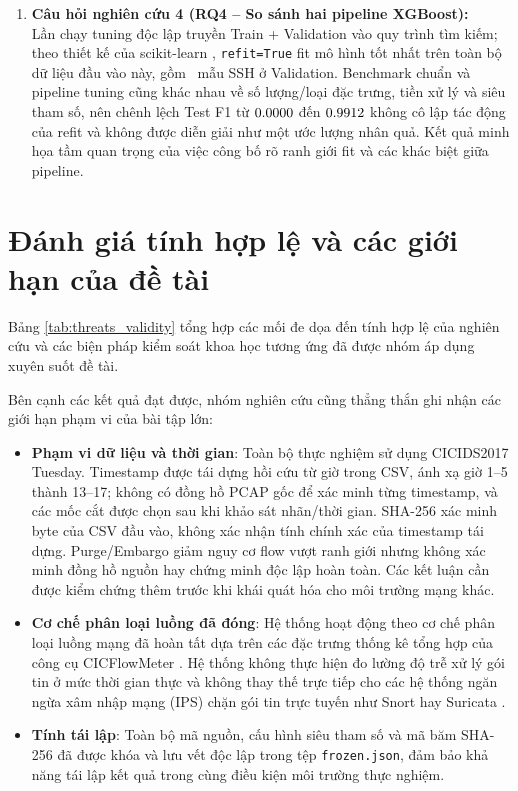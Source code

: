\begin{enumerate}
    \item \textbf{Câu hỏi nghiên cứu 4 (RQ4 -- So sánh hai pipeline XGBoost):}\\
    Lần chạy tuning độc lập truyền Train + Validation vào quy trình tìm kiếm; theo thiết kế của scikit-learn \cite{scikit_learn_refit}, \texttt{refit=True} fit mô hình tốt nhất trên toàn bộ dữ liệu đầu vào này, gồm \DataValidationSSH\ mẫu SSH ở Validation. Benchmark chuẩn và pipeline tuning cũng khác nhau về số lượng/loại đặc trưng, tiền xử lý và siêu tham số, nên chênh lệch Test F1 từ $0.0000$ đến $0.9912$ không cô lập tác động của refit và không được diễn giải như một ước lượng nhân quả. Kết quả minh họa tầm quan trọng của việc công bố rõ ranh giới fit và các khác biệt giữa pipeline.
\end{enumerate}

\section{Đánh giá tính hợp lệ và các giới hạn của đề tài}
\label{sec:threats_validity}

Bảng \ref{tab:threats_validity} tổng hợp các mối đe dọa đến tính hợp lệ của nghiên cứu và các biện pháp kiểm soát khoa học tương ứng đã được nhóm áp dụng xuyên suốt đề tài.



Bên cạnh các kết quả đạt được, nhóm nghiên cứu cũng thẳng thắn ghi nhận các giới hạn phạm vi của bài tập lớn:
\begin{itemize}
    \item \textbf{Phạm vi dữ liệu và thời gian}: Toàn bộ thực nghiệm sử dụng CICIDS2017 Tuesday. Timestamp được tái dựng hồi cứu từ giờ trong CSV, ánh xạ giờ 1--5 thành 13--17; không có đồng hồ PCAP gốc để xác minh từng timestamp, và các mốc cắt được chọn sau khi khảo sát nhãn/thời gian. SHA-256 xác minh byte của CSV đầu vào, không xác nhận tính chính xác của timestamp tái dựng. Purge/Embargo giảm nguy cơ flow vượt ranh giới nhưng không xác minh đồng hồ nguồn hay chứng minh độc lập hoàn toàn. Các kết luận cần được kiểm chứng thêm trước khi khái quát hóa cho môi trường mạng khác.
    \item \textbf{Cơ chế phân loại luồng đã đóng}: Hệ thống hoạt động theo cơ chế phân loại luồng mạng đã hoàn tất dựa trên các đặc trưng thống kê tổng hợp của công cụ CICFlowMeter \cite{sharafaldin2018generating}. Hệ thống không thực hiện đo lường độ trễ xử lý gói tin ở mức thời gian thực và không thay thế trực tiếp cho các hệ thống ngăn ngừa xâm nhập mạng (IPS) chặn gói tin trực tuyến như Snort \cite{roesch1999snort} hay Suricata \cite{suricata_oisf}.
    \item \textbf{Tính tái lập}: Toàn bộ mã nguồn, cấu hình siêu tham số và mã băm SHA-256 đã được khóa và lưu vết độc lập trong tệp \texttt{frozen.json}, đảm bảo khả năng tái lập kết quả trong cùng điều kiện môi trường thực nghiệm.
\end{itemize}


